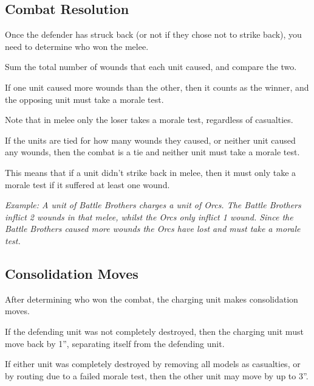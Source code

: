\documentclass[9pt, a4paper]{extarticle}            %
\begin{document}
\begin{multicols}{2}

\subsection{Combat Resolution}

Once the defender has struck back (or not if they chose not to strike back), you need to determine who won the melee.

Sum the total number of wounds that each unit caused, and compare the two.

If one unit caused more wounds than the other, then it counts as the winner, and the opposing unit must take a morale test.

Note that in melee only the loser takes a morale test, regardless of casualties.

If the units are tied for how many wounds they caused, or neither unit caused any wounds, then the combat is a tie and neither unit must take a morale test.

This means that if a unit didn’t strike back in melee, then it must only take a morale test if it suffered at least one wound.

\textit{Example: A unit of Battle Brothers charges a unit of Orcs. The Battle Brothers inflict 2 wounds in that melee, whilst the Orcs only inflict 1 wound. Since the Battle Brothers caused more wounds the Orcs have lost and must take a morale test.}

\subsection{Consolidation Moves}

After determining who won the combat, the charging unit makes consolidation moves.

If the defending unit was not completely destroyed, then the charging unit must move back by 1”, separating itself from the defending unit.

If either unit was completely destroyed by removing all models as casualties, or by routing due to a failed morale test, then the other unit may move by up to 3”.

\vfill\null

\columnbreak

\vfill\null

\end{multicols}
\end{document}
